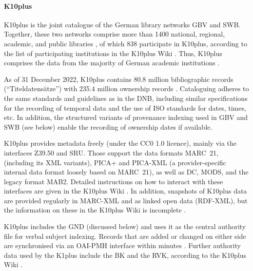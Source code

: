 \paragraph{K10plus}

%
%
\gls{K10plus} is the joint catalogue of the German library networks \gls{GBV} and \gls{SWB}.
Together, these two networks comprise more than 1400 national, regional,
academic, and public libraries \autocite{BSZGBV,GBV_VZG},
of which 838 participate in K10plus, according to the list of participating institutions
in the K10plus Wiki \autocite{K10plusWiki}. Thus, K10plus comprises the data from
the majority of German academic institutions \autocite[cf.][]{BSZ_K10plus}.

As of 31 December 2022, K10plus contains 80.8 million bibliographic records (\enquote{Titeldatensätze})
with 235.4 million ownership records \autocite{GBV_K10plus_Statistik}.
Cataloguing adheres to the same standards and guidelines as in the DNB,
including similar specifications for the recording of temporal data and the use of ISO standards for dates, times, etc.
In addition, the structured variants of provenance indexing used in \gls{GBV} and \gls{SWB}
(see below) enable the recording of ownership dates if available.

K10plus provides metadata freely (under the CC0 1.0 licence),
mainly via the interfaces \gls{Z39.50} and \gls{SRU}.
Those support the data formats \gls{MARC}~21, (including its XML variants),
PICA+ and PICA-XML (a provider-specific internal data format loosely based on MARC~21),
as well as \gls{DC}, \gls{MODS}, and the legacy format \gls{MAB}2.
Detailed instructions on how to interact with these interfaces
are given in the K10plus Wiki \autocite{K10plusWiki}.
In addition, snapshots of K10plus data are provided regularly
in \gls{MARC}-XML and as linked open data (\gls{RDF}-XML), but the information
on these in the K10plus Wiki is incomplete \autocite{K10plusWikiOD}.

K10plus includes the \gls{GND} (discussed below) and uses it as the central authority file for verbal subject indexing.
Records that are added or changed on either side are synchronised via an \gls{OAI-PMH} interface
within minutes \autocite[cf.][]{K10plusHandbuchNormdaten}.
Further authority data used by the K1plus include the \gls{BK} and the \gls{RVK},
according to the K10plus Wiki \autocite{K10plusWikiNormdaten}.


